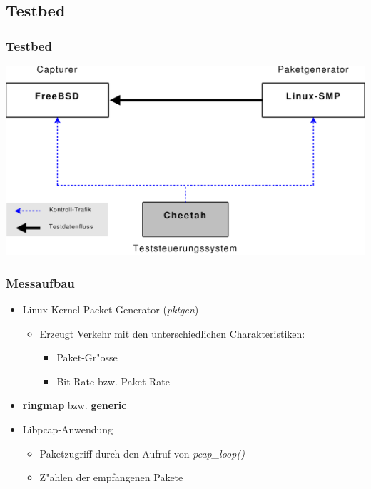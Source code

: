 \documentclass{beamer}
\begin{document}
\subsection*{Testbed}
\begin{frame}
\frametitle{Testbed}
\begin{center}
\includegraphics [height=0.68\textheight]{pics/Messaufbau}
\end{center}
\end{frame}

\begin{frame}
\frametitle{Messaufbau}
\begin{itemize}
	\item <1->Linux Kernel Packet Generator (\emph{pktgen})
		\begin{itemize}
			\item <1->Erzeugt Verkehr mit den unterschiedlichen Charakteristiken: 
				\begin{itemize}
					\item <1->Paket-Gr"osse
					\item <1->Bit-Rate bzw. Paket-Rate
				\end{itemize}
		\end{itemize}
\end{itemize}
\begin{itemize}
	\item <2->\textbf{ringmap} bzw. \textbf{generic}
	\item <2->Libpcap-Anwendung
		\begin{itemize}
			\item <2->Paketzugriff durch den Aufruf von \emph{pcap\_loop()}
			\item <2->Z"ahlen der empfangenen Pakete
		\end{itemize}
\end{itemize}
\end{frame}
\end{document}
